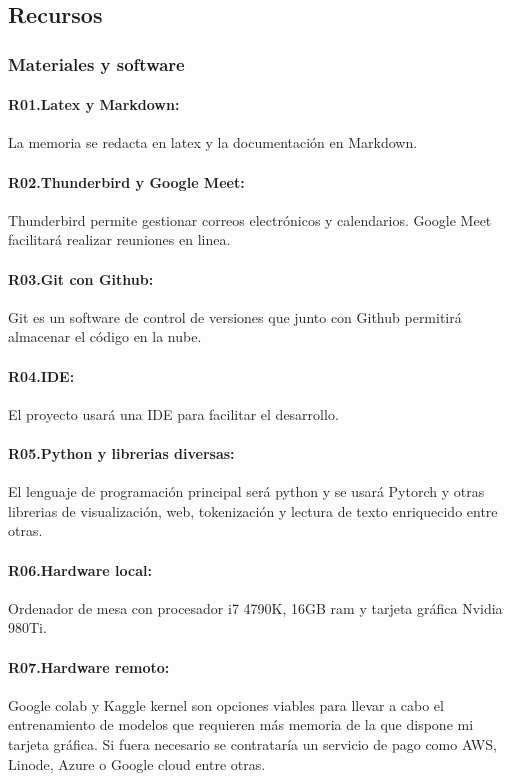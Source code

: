 \subsection{Recursos}
\subsubsection{Materiales y software}
\paragraph{R01.\quad Latex y Markdown:}\label{R01} La memoria se redacta en latex y la documentación en Markdown.
\paragraph{R02.\quad Thunderbird y Google Meet:}\label{R02} Thunderbird permite gestionar
correos electrónicos y calendarios. Google Meet facilitará realizar reuniones en linea.
\paragraph{R03.\quad Git con Github:}\label{R03} Git es un software de control de versiones que junto con Github
permitirá almacenar el código en la nube.
\paragraph{R04.\quad IDE:}\label{R04} El proyecto usará una IDE para facilitar el desarrollo.
\paragraph{R05.\quad Python y librerias diversas:}\label{R05} El lenguaje de programación principal será python y 
se usará Pytorch y otras librerias de visualización, web, tokenización y lectura de texto enriquecido entre otras.
\paragraph{R06.\quad Hardware local:}\label{R06} Ordenador de mesa con procesador i7 4790K, 16GB ram y tarjeta gráfica
Nvidia 980Ti.
\paragraph{R07.\quad Hardware remoto:}\label{R07} Google colab y Kaggle kernel son opciones viables para llevar a cabo el entrenamiento
de modelos que requieren más memoria de la que dispone mi tarjeta gráfica.
Si fuera necesario se contrataría un servicio de pago como AWS, Linode, Azure o Google
cloud entre otras.


